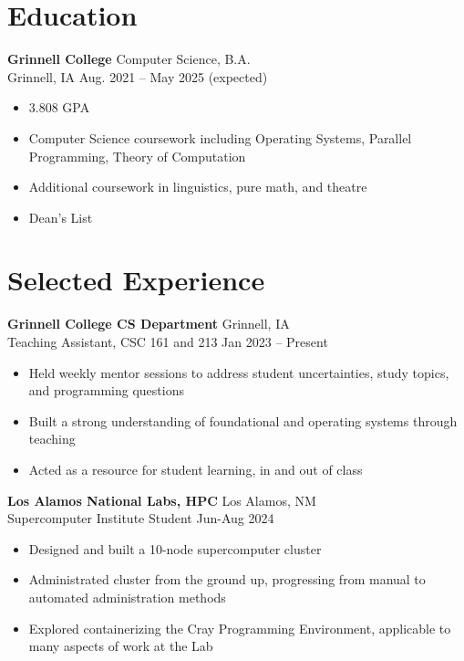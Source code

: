 \documentclass[12pt]{article}
\newcommand{\entry}[4]{{{\textbf{#1}}} \hfill #3 \\ #2 \hfill #4}
\begin{document}
\noindent %
\begin{minipage}[t]{0.63\textwidth}

  \section{Education}
  \entry{Grinnell College}{Grinnell, IA}{Computer Science, B.A.}{Aug. 2021 -- May 2025 (expected)}
  \begin{itemize}[noitemsep,leftmargin=3.5mm,rightmargin=0mm,topsep=6pt]
    \item 3.808 GPA
    \item Computer Science coursework including Operating Systems, Parallel Programming, Theory of Computation
    \item Additional coursework in linguistics, pure math, and theatre
    \item Dean's List %
  \end{itemize}


  \section{Selected Experience}
  \entry{Grinnell College CS Department}{Teaching Assistant, CSC 161 and 213}{Grinnell, IA}{Jan 2023 -- Present}
  \begin{itemize}[noitemsep,leftmargin=3.5mm,rightmargin=0mm,topsep=6pt]
    \item Held weekly mentor sessions to address student uncertainties, study topics, and programming questions
    \item Built a strong understanding of foundational and operating systems through teaching
    \item Acted as a resource for student learning, in and out of class
  \end{itemize}

  \medskip

  \entry{Los Alamos National Labs, HPC}{Supercomputer Institute Student}{Los Alamos, NM}{Jun-Aug 2024}
  \begin{itemize}[noitemsep,leftmargin=3.5mm,rightmargin=0mm,topsep=6pt]
    \item Designed and built a 10-node supercomputer cluster
    \item Administrated cluster from the ground up, progressing from manual to automated administration methods
    \item Explored containerizing the Cray Programming Environment, applicable to many aspects of work at the Lab
  \end{itemize}


\end{minipage}
\end{document}
